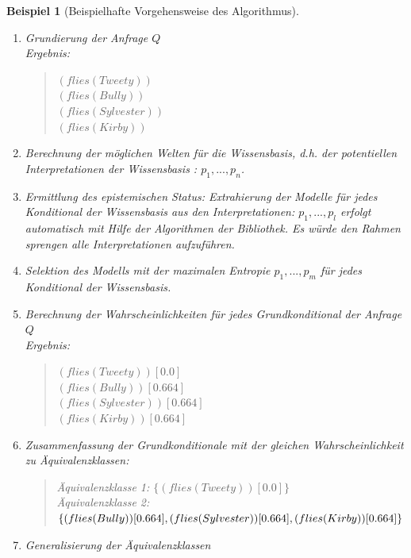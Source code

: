 \documentclass[a4paper, 11pt]{book}
\newtheorem{Bsp}{Beispiel}[section]
\begin{document}
{\begin{Bsp}[Beispielhafte Vorgehensweise des Algorithmus]
\begin{enumerate}
		\item Grundierung der Anfrage $ Q $\\
		Ergebnis:
		\begin{quote}
			$ (flies(Tweety))$\\
			$ (flies(Bully))$\\
			$ (flies(Sylvester))$\\
			$ (flies(Kirby))$\\
		\end{quote}
		\item Berechnung der möglichen Welten für die Wissensbasis, d.h. der potentiellen Interpretationen der Wissensbasis : $ p_1, ..., p_n $.
		\item Ermittlung des epistemischen Status: Extrahierung der Modelle für jedes Konditional der Wissensbasis aus den Interpretationen: $ p_1, ..., p_l $ erfolgt automatisch mit Hilfe der Algorithmen der Bibliothek. Es würde den Rahmen sprengen alle Interpretationen aufzuführen.\\
		\item Selektion des Modells mit der maximalen Entropie $p_1, ..., p_m$ für jedes Konditional der Wissensbasis.
		\item Berechnung der Wahrscheinlichkeiten für jedes Grundkonditional der Anfrage $ Q $\\
		Ergebnis:
		\begin{quote}
			$(flies(Tweety))[0.0]$\\
			$(flies(Bully))[0.664]$\\
			$(flies(Sylvester))[0.664]$\\
			$(flies(Kirby))[0.664]$
		\end{quote}
		\item Zusammenfassung der Grundkonditionale mit der gleichen Wahrscheinlichkeit zu Äquivalenzklassen:
		
		\begin{quote}
			Äquivalenzklasse 1: $\{(flies(Tweety))[0.0]\}$\\
			Äquivalenzklasse 2: $\{(flies(Bully))[0.664], (flies(Sylvester))[0.664],\\ (flies(Kirby))[0.664]\}$
		\end{quote}
		
		\item Generalisierung der Äquivalenzklassen
		\begin{quote}
			

\end{quote}
\end{enumerate}
\end{Bsp}}
\end{document}
